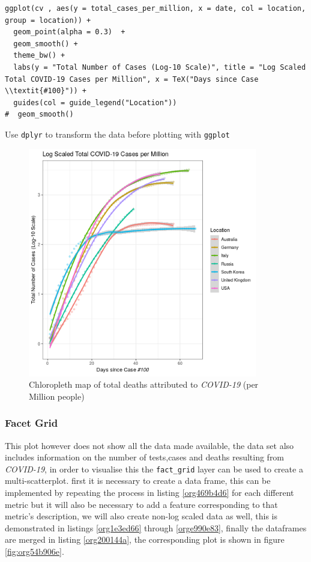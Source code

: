 \documentclass[11pt]{article}
\begin{document}
\begin{listing}[htbp]
\begin{verbatim}
ggplot(cv , aes(y = total_cases_per_million, x = date, col = location, group = location)) +
  geom_point(alpha = 0.3)  +
  geom_smooth() +
  theme_bw() +
  labs(y = "Total Number of Cases (Log-10 Scale)", title = "Log Scaled Total COVID-19 Cases per Million", x = TeX("Days since Case \\textit{#100}")) +
  guides(col = guide_legend("Location"))
#  geom_smooth()
\end{verbatim}
\caption{\label{org19be2d1}Use \texttt{dplyr} to transform the data before plotting with \texttt{ggplot}}
\end{listing}


\begin{figure}[htbp]
\centering
\includegraphics[width=10cm]{FirstTS.png}
\caption{\label{fig:orgbc8ceb4}Chloropleth map of total deaths attributed to \emph{COVID-19} (per Million people)}
\end{figure}


\subsubsection{Facet Grid}
\label{sec:org82df0c5}
This plot however does not show all the data made available, the data set also includes information on the number of tests,cases and deaths resulting from \emph{COVID-19}, in order to visualise this the \texttt{fact\_grid} layer can be used to create a multi-scatterplot. first it is necessary to create a data frame, this can be implemented by repeating the process in listing \ref{org469b4d6} for each different metric but it will also be necessary to add a feature corresponding to that metric's description, we will also create non-log scaled data as well, this is demonstrated in listings \ref{org1e3ed66} through \ref{orge990e83}, finally the dataframes are merged in listing \ref{org200144a}, the corresponding plot is shown in figure \ref{fig:org54b906e}.
\end{document}
